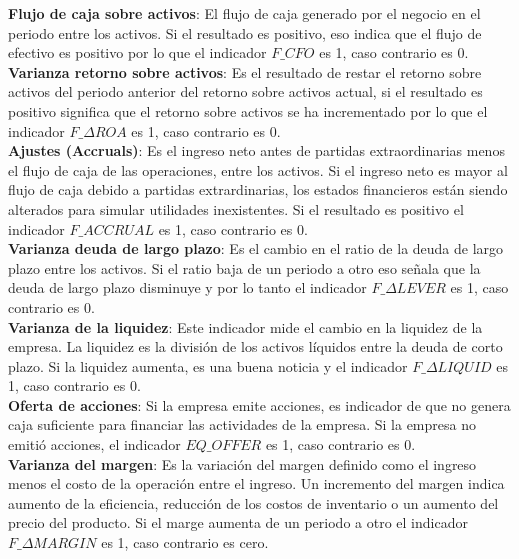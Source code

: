 \textbf{Flujo de caja sobre activos}: El flujo de caja generado por el negocio en el periodo entre los activos. Si el resultado es positivo, eso indica que el flujo de efectivo es positivo por lo que el indicador $F\_CFO$  es 1, caso contrario es 0.\\

\textbf{Varianza retorno sobre activos}: Es el resultado de restar el retorno sobre activos del periodo anterior del retorno sobre activos actual, si el resultado es positivo significa que el retorno sobre activos se ha incrementado por lo que el indicador $F\_\Delta ROA$ es 1, caso contrario es 0.\\

\textbf{Ajustes (Accruals)}: Es el ingreso neto antes de partidas extraordinarias menos el flujo de caja de las operaciones, entre los activos.  Si el ingreso neto es mayor al flujo de caja debido a partidas extrardinarias, los estados financieros están siendo alterados para simular utilidades inexistentes. Si el resultado es positivo el indicador $F\_ACCRUAL$ es 1, caso contrario es 0.\\

\textbf{Varianza deuda de largo plazo}: Es el cambio en el ratio de la deuda de largo plazo entre los activos. Si el ratio baja de un periodo a otro eso señala que la deuda de largo plazo disminuye y por lo tanto el indicador $F\_\Delta LEVER$ es 1, caso contrario es 0.\\

\textbf{Varianza de la liquidez}: Este indicador mide el cambio en la liquidez de la empresa. La liquidez es la división de los activos l\'iquidos entre la deuda de corto plazo. Si la liquidez aumenta, es una buena noticia y el indicador $F\_\Delta LIQUID$ es 1, caso contrario es 0.\\

\textbf{Oferta de acciones}: Si la empresa emite acciones, es indicador de que no genera caja suficiente para financiar las actividades de la empresa. Si la empresa no emitió acciones, el indicador $EQ\_OFFER$ es 1, caso contrario es 0.\\

\textbf{Varianza del margen}: Es la variación del margen definido como el ingreso menos el costo de la operación entre el ingreso. Un incremento del margen indica aumento de la eficiencia, reducción de los costos de inventario o un aumento del precio del producto. Si el marge aumenta de un periodo a otro el indicador $F\_\Delta MARGIN$ es 1, caso contrario es cero. \\

